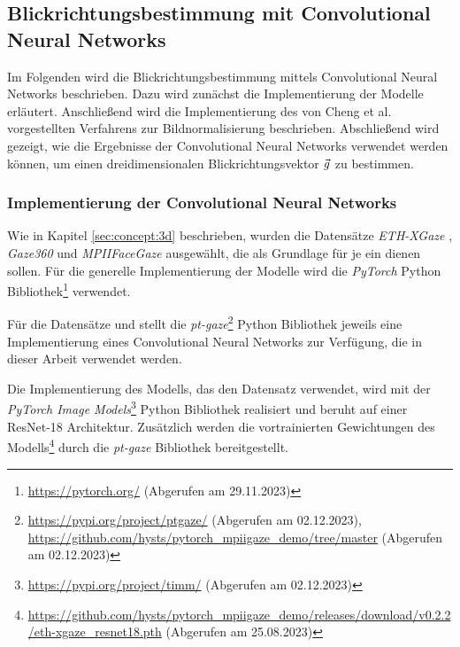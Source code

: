\subsection{Blickrichtungsbestimmung mit Convolutional Neural Networks}\label{sec:implementation:gaze:vector:models}

Im Folgenden wird die Blickrichtungsbestimmung mittels Convolutional Neural Networks beschrieben. Dazu wird zunächst die Implementierung der Modelle erläutert. Anschließend wird die Implementierung des von Cheng et al. vorgestellten Verfahrens zur Bildnormalisierung \cite{paper:basics:survey} beschrieben. Abschließend wird gezeigt, wie die Ergebnisse der Convolutional Neural Networks verwendet werden können, um einen dreidimensionalen Blickrichtungsvektor $\vec{g}$ zu bestimmen.


\subsubsection{Implementierung der Convolutional Neural Networks}

Wie in Kapitel \ref{sec:concept:3d} beschrieben, wurden die Datensätze \textit{ETH-XGaze} \cite{paper:eth-xgaze}, \textit{Gaze360} \cite{paper:gaze360} und \textit{MPIIFaceGaze} \cite{paper:mpiifacegaze} ausgewählt, die als Grundlage für je ein \cnn dienen sollen. Für die generelle Implementierung der Modelle wird die \textit{PyTorch} Python Bibliothek\footnote{\url{https://pytorch.org/} (Abgerufen am 29.11.2023)} verwendet.

Für die Datensätze \ethg und \mpii stellt die \textit{pt-gaze}\footnote{\url{https://pypi.org/project/ptgaze/} (Abgerufen am 02.12.2023), \url{https://github.com/hysts/pytorch_mpiigaze_demo/tree/master} (Abgerufen am 02.12.2023)} Python Bibliothek jeweils eine Implementierung eines Convolutional Neural Networks zur Verfügung, die in dieser Arbeit verwendet werden. 

Die Implementierung des Modells, das den \ethg Datensatz verwendet, wird mit der \textit{PyTorch Image Models}\footnote{\url{https://pypi.org/project/timm/} (Abgerufen am 02.12.2023)} Python Bibliothek realisiert und beruht auf einer ResNet-18 Architektur. Zusätzlich werden die vortrainierten Gewichtungen des Modells\footnote{\url{https://github.com/hysts/pytorch_mpiigaze_demo/releases/download/v0.2.2/eth-xgaze_resnet18.pth} (Abgerufen am 25.08.2023)} durch die \textit{pt-gaze} Bibliothek bereitgestellt. 

